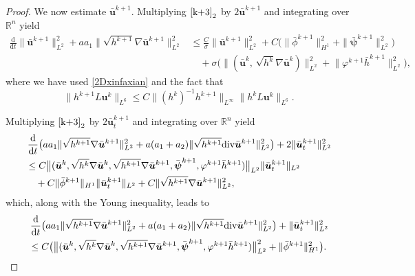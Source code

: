 \documentclass[11pt,reqno]{amsart}
\numberwithin{rk}{section}
\numberwithin{prop}{section}
\numberwithin{mydef}{section}
\numberwithin{lem}{section}
\numberwithin{equation}{section}
\numberwithin{thm}{section}
\begin{document}
\begin{proof}
We now estimate  $\bar{\boldsymbol{u}}^{k+1}$. Multiplying $\eqref{k+3}_2$ by $2\bar{\boldsymbol{u}}^{k+1}$ and integrating over $\mathbb{R}^n$ yield 
\begin{equation}\label{ubar}
\begin{aligned}
\frac{\mathrm{d}}{\mathrm{d}t}\|\bar{\boldsymbol{u}}^{k+1}\|^2_{L^2}\!+\!aa_1\|\sqrt{h^{k+1}}\nabla\bar{\boldsymbol{u}}^{k+1}\|^2_{L^2}&\leq \frac{C}{\sigma}\|\bar{\boldsymbol{u}}^{k+1}\|^2_{L^2}+C\big(\|\bar{\phi}^{k+1}\|^2_{H^1}+\|\bar{\boldsymbol{\psi}}^{k+1}\|^2_{L^2}\big)\\
&\quad +\sigma\big(\|(\bar{\boldsymbol{u}}^{k},\,\sqrt{h^{k}}\nabla\bar{\boldsymbol{u}}^{k})\|^2_{L^2}\!+\!\|\varphi^{k+1}\bar{h}^{k+1}\|^2_{L^2}\big),
\end{aligned}
\end{equation}
where we have used \eqref{2Dxinfaxian} and the fact that
\begin{equation*}
\|h^{k+1}L\boldsymbol{u}^k\|_{L^6}\leq C\|(h^k)^{-1}h^{k+1}\|_{L^\infty}\|h^{k}L\boldsymbol{u}^k\|_{L^6}.    
\end{equation*} 

Multiplying $\eqref{k+3}_2$ by $2\bar{\boldsymbol{u}}_t^{k+1}$ and integrating over $\mathbb{R}^n$ yield 
\begin{equation*} 
\begin{aligned}
&\,\frac{\rm d}{{\rm d}t}\big(a a_1\|\sqrt{h^{k+1}}\nabla\bar{\boldsymbol{u}}^{k+1}\|^2_{L^2}
+a(a_1+a_2)\|\sqrt{h^{k+1}}\mathrm{div}\bar{\boldsymbol{u}}^{k+1}\|^2_{L^2}\big)+2\|\bar{\boldsymbol{u}}^{k+1}_t\|^2_{L^2}\\
&\leq C\big\|(\bar{\boldsymbol{u}}^k,\sqrt{h^k}\nabla\bar{\boldsymbol{u}}^k,\sqrt{h^{k+1}}\nabla\bar{\boldsymbol{u}}^{k+1},\bar{\boldsymbol{\psi}}^{k+1},\varphi^{k+1}\bar{h}^{k+1})\big\|_{L^2}\|\bar{\boldsymbol{u}}^{k+1}_t\|_{L^2}\\
&\quad +C\|\bar{\phi}^{k+1}\|_{H^1} \|\bar{\boldsymbol{u}}^{k+1}_t\|_{L^2} +C\|\sqrt{h^{k+1}}\nabla\bar{\boldsymbol{u}}^{k+1}\|_{L^2}^2,
\end{aligned}
\end{equation*}
which, along with the Young inequality, leads to
\begin{equation}\label{hubar}
\begin{aligned}
&\,\frac{\rm d}{{\rm d}t}\big(a a_1\|\sqrt{h^{k+1}}\nabla\bar{\boldsymbol{u}}^{k+1}\|^2_{L^2}
+a(a_1+a_2)\|\sqrt{h^{k+1}}\mathrm{div}\bar{\boldsymbol{u}}^{k+1}\|^2_{L^2}\big)+\|\bar{\boldsymbol{u}}^{k+1}_t\|^2_{L^2}\\
&\leq C\big(\big\|(\bar{\boldsymbol{u}}^k,
\sqrt{h^k}\nabla\bar{\boldsymbol{u}}^k,\sqrt{h^{k+1}}\nabla\bar{\boldsymbol{u}}^{k+1},\bar{\boldsymbol{\psi}}^{k+1},\varphi^{k+1}\bar{h}^{k+1})\big\|_{L^2}^2+\|\bar{\phi}^{k+1}\|_{H^1}^2 \big).
\end{aligned}
\end{equation}


\end{proof}
\end{document}
